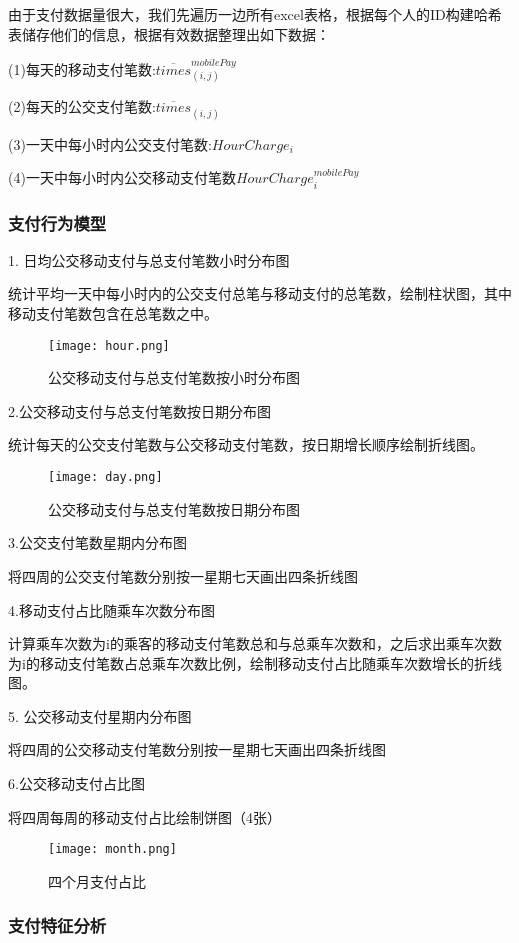 \documentclass[withoutpreface,bwprint]{cumcmthesis} %
\begin{document}
由于支付数据量很大，我们先遍历一边所有excel表格，根据每个人的ID构建哈希表储存他们的信息，根据有效数据整理出如下数据：

(1)每天的移动支付笔数:$\overline {times}^{mobilePay}_{(i,j)}​$

(2)每天的公交支付笔数:$\overline {times}_{(i,j)}$

(3)一天中每小时内公交支付笔数:$HourCharge_{i}$

(4)一天中每小时内公交移动支付笔数$HourCharge_{i}^{mobilePay}$

\subsubsection{支付行为模型}

1. 日均公交移动支付与总支付笔数小时分布图

统计平均一天中每小时内的公交支付总笔与移动支付的总笔数，绘制柱状图，其中移动支付笔数包含在总笔数之中。
\begin{figure}[h]
\texttt{[image: hour.png]}
\caption{公交移动支付与总支付笔数按小时分布图}
\end{figure}


2.公交移动支付与总支付笔数按日期分布图

统计每天的公交支付笔数与公交移动支付笔数，按日期增长顺序绘制折线图。
\begin{figure}[h]
\texttt{[image: day.png]}
\caption{公交移动支付与总支付笔数按日期分布图}
\end{figure}
3.公交支付笔数星期内分布图

将四周的公交支付笔数分别按一星期七天画出四条折线图

4.移动支付占比随乘车次数分布图

计算乘车次数为i的乘客的移动支付笔数总和与总乘车次数和，之后求出乘车次数为i的移动支付笔数占总乘车次数比例，绘制移动支付占比随乘车次数增长的折线图。

5. 公交移动支付星期内分布图

将四周的公交移动支付笔数分别按一星期七天画出四条折线图

6.公交移动支付占比图

将四周每周的移动支付占比绘制饼图（4张）
\begin{figure}[h]
\centering
\texttt{[image: month.png]}
\caption{四个月支付占比}
\end{figure}

\subsubsection{支付特征分析}
\end{document}
